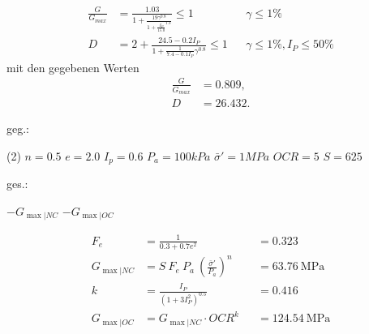 \begin{questions}
    \begin{center}\end{center}

    \begin{solution}
        \begin{align*}
            \frac{G}{G_{max}} 
            & = \frac{1.03}{1+\frac{19 \gamma^{0.8}}{1+ \frac{I_P}{15.0}^{1.3}}} \leq 1  
            & & \gamma \leq 1 \% \\
            D 
            & = 2 + \frac{24.5 - 0.2 I_P}{1 + \frac{1}{7.4 - 0.1 I_P} \gamma^{0.8}} \leq 1 
            & & \gamma \leq 1 \%, I_P \leq 50 \% 
            \end{align*}
            mit den gegebenen Werten
            \begin{align*}
            \frac{G}{G_{max}} &= 0.809,\\
            D &= 26.432.
        \end{align*}
    \end{solution}
\vspace{1cm}

\vspace{1em}

     \begin{minipage}[t]{.49\linewidth}
        geg.:
        \begin{tasks} (2)
            \task[] $n = 0.5$
            \task[] $e = 2.0$
            \task[] $I_p = 0.6$
            \task[] $P_a = 100 kPa$
            \task[] $\bar \sigma' = 1 MPa$
            \task[] $OCR = 5$
            \task[] $S = 625$
        \end{tasks}
    \end{minipage}
    \begin{minipage}[t]{.49\linewidth}
    ges.:
        \begin{tasks}
            \task[] $- G_{\max|NC}$
            \task[] $- G_{\max|OC}$
        \end{tasks}
    \end{minipage}
    \begin{center}\end{center}

    \begin{solution}
        \begin{align*}
            F_e &= \frac{1}{0.3 + 0.7 e^2} &&= 0.323\\
            G_{\max | NC} &= S\ F_e\ P_a\ (\frac{\bar \sigma'}{P_a})^n &&= \SI{63.76}{\mega \pascal} \\
            k &= \frac{I_P}{(1+ 3 I_P^2)^{0.5}} &&= 0.416 \\
            G_{\max | OC} &= G_{\max | NC}\cdot OCR^k &&= \SI{124.54}{\mega \pascal}\\
        \end{align*}
    \end{solution}


\end{questions}
